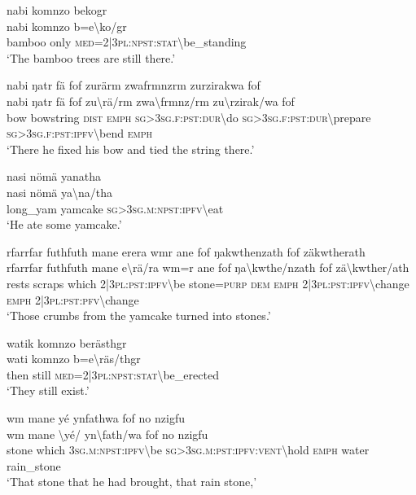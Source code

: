 \ea\label{ex:1:a3698}
nabi komnzo bekogr\\
\gll nabi	komnzo	b=e{\textbackslash}ko/gr\\
     bamboo	only	\textsc{med}=2|3\textsc{pl}:\textsc{npst}:\textsc{stat}{\textbackslash}be\_standing\\
\glt `The bamboo trees are still there.'
\z

\ea\label{ex:1:a3699}
nabi ŋatr fä fof zurärm zwafrmnzrm zurzirakwa fof\\
\gll nabi	ŋatr	fä	fof	zu{\textbackslash}rä/rm	zwa{\textbackslash}frmnz/rm	zu{\textbackslash}rzirak/wa	fof\\
     bow	bowstring	\textsc{dist}	\textsc{emph}	\textsc{sg}>3\textsc{sg}.\textsc{f}:\textsc{pst}:\textsc{dur}{\textbackslash}do	\textsc{sg}>3\textsc{sg}.\textsc{f}:\textsc{pst}:\textsc{dur}{\textbackslash}prepare	\textsc{sg}>3\textsc{sg}.\textsc{f}:\textsc{pst}:\textsc{ipfv}{\textbackslash}bend	\textsc{emph}\\
\glt `There he fixed his bow and tied the string there.'
\z

\ea\label{ex:1:a3702}
nasi nömä yanatha\\
\gll nasi	nömä	ya{\textbackslash}na/tha\\
     long\_yam	yamcake	\textsc{sg}>3\textsc{sg}.\textsc{m}:\textsc{npst}:\textsc{ipfv}{\textbackslash}eat\\
\glt `He ate some yamcake.'
\z

\ea\label{ex:1:a3703}
rfarrfar futhfuth mane erera wmr ane fof ŋakwthenzath fof zäkwtherath\\
\gll rfarrfar	futhfuth	mane	e{\textbackslash}rä/ra	wm=r	ane	fof	ŋa{\textbackslash}kwthe/nzath	fof	zä{\textbackslash}kwther/ath\\
     rests	scraps	which	2|3\textsc{pl}:\textsc{pst}:\textsc{ipfv}{\textbackslash}be	stone=\textsc{purp}	\textsc{dem}	\textsc{emph}	2|3\textsc{pl}:\textsc{pst}:\textsc{ipfv}{\textbackslash}change	\textsc{emph}	2|3\textsc{pl}:\textsc{pst}:\textsc{pfv}{\textbackslash}change\\
\glt `Those crumbs from the yamcake turned into stones.'
\z

\ea\label{ex:1:a3707}
watik komnzo berästhgr\\
\gll wati	komnzo	b=e{\textbackslash}räs/thgr\\
     then	still	\textsc{med}=2|3\textsc{pl}:\textsc{npst}:\textsc{stat}{\textbackslash}be\_erected\\
\glt `They still exist.'
\z

\ea\label{ex:1:a3708}
wm mane yé ynfathwa fof no nzigfu\\
\gll wm	mane	{\textbackslash}yé/	yn{\textbackslash}fath/wa	fof	no	nzigfu\\
     stone	which	3\textsc{sg}.\textsc{m}:\textsc{npst}:\textsc{ipfv}{\textbackslash}be	\textsc{sg}>3\textsc{sg}.\textsc{m}:\textsc{pst}:\textsc{ipfv}:\textsc{vent}{\textbackslash}hold	\textsc{emph}	water	rain\_stone\\
\glt `That stone that he had brought, that rain stone,'
\z


